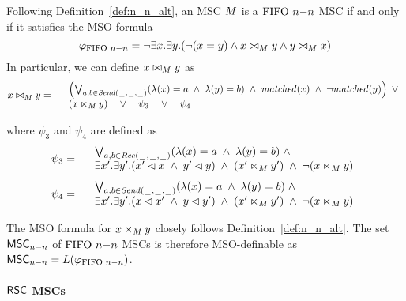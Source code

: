 Following Definition~\ref{def:n_n_alt}, an MSC $M$ is a $\text{FIFO } n\mathsf{-}n$ MSC if and only if it satisfies the MSO formula
\[
	\varphi_{\text{FIFO } n\mathsf{-}n} = \neg \exists x.\exists y.(\neg (x = y) \wedge x \bowtie_M y \wedge y \bowtie_M x)
\]
In particular, we can define $x \bowtie_M y$ as
\[
	x \bowtie_M y =
	\begin{array}{rl}
	& \left(
		\bigvee_{\substack{a,b \in {\mathit{Send}(\hspace{0.1em}\underline{\hspace{0.5em}}\hspace{0.1em},\hspace{0.1em}\underline{\hspace{0.5em}}\hspace{0.1em},\hspace{0.1em}\underline{\hspace{0.5em}}\hspace{0.1em})}}}
		(\lambda(x) = a \;\wedge\; \lambda(y) = b)
		\;\wedge\; \mathit{matched}(x) \;\wedge\; \neg \mathit{matched}(y)
	\right) \;\vee\\
	& (x \ltimes_M y) \quad \vee \quad \psi_3 \quad \vee \quad \psi_4\\
	\end{array}
\]

\noindent where $\psi_3$ and $\psi_4$ are defined as 
\[
	\psi_3 =
	\begin{array}{rl}
		& \bigvee_{\substack{a,b \in {\mathit{Rec}(\hspace{0.1em}\underline{\hspace{0.5em}}\hspace{0.1em},\hspace{0.1em}\underline{\hspace{0.5em}}\hspace{0.1em},\hspace{0.1em}\underline{\hspace{0.5em}}\hspace{0.1em})}}}
		  (\lambda(x) = a \;\wedge\; \lambda(y) = b)
		  \;\wedge\; \\
		& \exists x'.\exists y'.(x' \lhd x \;\wedge\; y' \lhd y) \;\wedge\; (x' \ltimes_M y') \;\wedge\; \neg(x \ltimes_M y)\\
	\end{array}
\]
\[
	\psi_4 =
	\begin{array}{rl}
		& \bigvee_{\substack{a,b \in {\mathit{Send}(\hspace{0.1em}\underline{\hspace{0.5em}}\hspace{0.1em},\hspace{0.1em}\underline{\hspace{0.5em}}\hspace{0.1em},\hspace{0.1em}\underline{\hspace{0.5em}}\hspace{0.1em})}}}
		  (\lambda(x) = a \;\wedge\; \lambda(y) = b)
		  \;\wedge\; \\
		& \exists x'.\exists y'.(x \lhd x' \;\wedge\; y \lhd y') \;\wedge\; (x' \ltimes_M y') \;\wedge\; \neg(x \ltimes_M y)\\
	\end{array}
\]

The MSO formula for $x \ltimes_M y$ closely follows Definition~\ref{def:n_n_alt}. The set $\mathsf{MSC}_{n\mathsf{-}n}$ of $\text{FIFO } n\mathsf{-}n$ MSCs is therefore MSO-definable as $\mathsf{MSC}_{n\mathsf{-}n}=L(\varphi_{\text{FIFO } n\mathsf{-}n})$.

\paragraph*{$\mathsf{RSC}$ MSCs}

